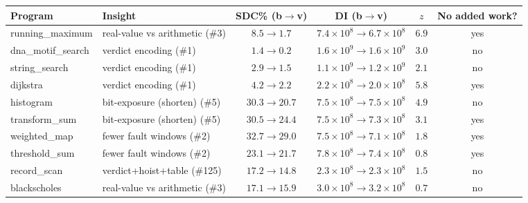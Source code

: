 \begin{tabular}{@{}llcccc@{}}
\toprule
\textbf{Program} & \textbf{Insight} & \textbf{SDC\% (b$\to$v)} & \textbf{DI (b$\to$v)} & $z$ & \textbf{No added work?} \\
\midrule
running\_maximum & real-value vs arithmetic (\#3) & $8.5 \to 1.7$ & $7.4\times10^{8}{\to}6.7\times10^{8}$ & $6.9$ & yes \\
dna\_motif\_search & verdict encoding (\#1) & $1.4 \to 0.2$ & $1.6\times10^{9}{\to}1.6\times10^{9}$ & $3.0$ & no \\
string\_search & verdict encoding (\#1) & $2.9 \to 1.5$ & $1.1\times10^{9}{\to}1.2\times10^{9}$ & $2.1$ & no \\
dijkstra & verdict encoding (\#1) & $4.2 \to 2.2$ & $2.2\times10^{8}{\to}2.0\times10^{8}$ & $5.8$ & yes \\
histogram & bit-exposure (shorten) (\#5) & $30.3 \to 20.7$ & $7.5\times10^{8}{\to}7.5\times10^{8}$ & $4.9$ & no \\
transform\_sum & bit-exposure (shorten) (\#5) & $30.5 \to 24.4$ & $7.5\times10^{8}{\to}7.3\times10^{8}$ & $3.1$ & yes \\
weighted\_map & fewer fault windows (\#2) & $32.7 \to 29.0$ & $7.5\times10^{8}{\to}7.1\times10^{8}$ & $1.8$ & yes \\
threshold\_sum & fewer fault windows (\#2) & $23.1 \to 21.7$ & $7.8\times10^{8}{\to}7.4\times10^{8}$ & $0.8$ & yes \\
record\_scan & verdict+hoist+table (\#125) & $17.2 \to 14.8$ & $2.3\times10^{8}{\to}2.3\times10^{8}$ & $1.5$ & no \\
blackscholes & real-value vs arithmetic (\#3) & $17.1 \to 15.9$ & $3.0\times10^{8}{\to}3.2\times10^{8}$ & $0.7$ & no \\
\bottomrule
\end{tabular}

